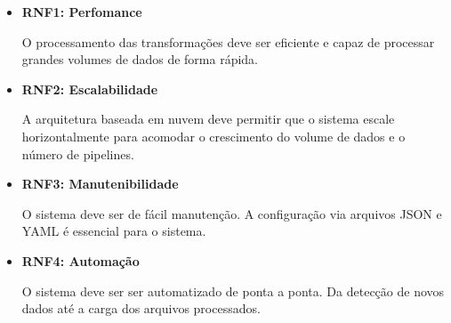 \begin{itemize}
    \item \textbf{RNF1: Perfomance}
    
    O processamento das transformações deve ser eficiente e capaz de processar grandes volumes de dados de forma rápida.

    \item \textbf{RNF2: Escalabilidade}
    
    A arquitetura baseada em nuvem deve permitir que o sistema escale horizontalmente para acomodar o crescimento do volume de dados e o número de pipelines.

    \item \textbf{RNF3: Manutenibilidade}
    
    O sistema deve ser de fácil manutenção. A configuração via arquivos JSON e YAML é essencial para o sistema.

    \item \textbf{RNF4: Automação}
    
    O sistema deve ser ser automatizado de ponta a ponta. Da detecção de novos dados até a carga dos arquivos processados.

\end{itemize}